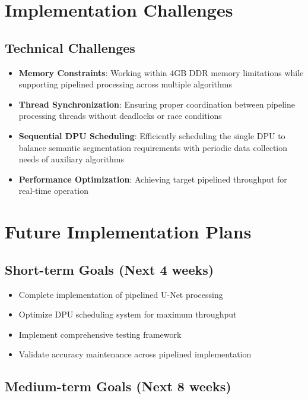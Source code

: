\section{Implementation Challenges}\label{subsec:implementation-challenges}

\subsection{Technical Challenges}\label{subsec:technical-challenges}

\begin{itemize}
\item \textbf{Memory Constraints}: Working within 4GB DDR memory limitations while supporting pipelined processing across multiple algorithms
\item \textbf{Thread Synchronization}: Ensuring proper coordination between pipeline processing threads without deadlocks or race conditions
\item \textbf{Sequential DPU Scheduling}: Efficiently scheduling the single DPU to balance semantic segmentation requirements with periodic data collection needs of auxiliary algorithms
\item \textbf{Performance Optimization}: Achieving target pipelined throughput for real-time operation
\end{itemize}

\section{Future Implementation Plans}\label{subsec:future-implementation}

\subsection{Short-term Goals (Next 4 weeks)}\label{subsec:short-term-goals}

\begin{itemize}
\item Complete implementation of pipelined U-Net processing
\item Optimize DPU scheduling system for maximum throughput
\item Implement comprehensive testing framework
\item Validate accuracy maintenance across pipelined implementation
\end{itemize}

\subsection{Medium-term Goals (Next 8 weeks)}\label{subsec:medium-term-goals}

